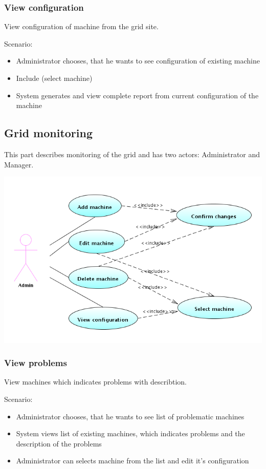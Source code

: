 \documentclass{article}
\begin{document}
\subsubsection{View configuration}
View configuration of machine from the grid site.

Scenario:
\begin{itemize}
\item{Administrator chooses, that he wants to see configuration of existing machine}
\item{Include (select machine)}
\item{System generates and view complete report from current configuration of the machine}
\end{itemize}

\subsection{Grid monitoring}
This part describes monitoring of the grid and has two actors: Administrator and Manager.

\includegraphics[width=\linewidth]{grid_managing.png}

\subsubsection{View problems}
View machines which indicates problems with describtion.

Scenario:
\begin{itemize}
\item{Administrator chooses, that he wants to see list of problematic machines}
\item{System views list of existing machines, which indicates problems and the description of the problems}
\item{Administrator can selects machine from the list and edit it's configuration}
\end{itemize}
\end{document}

